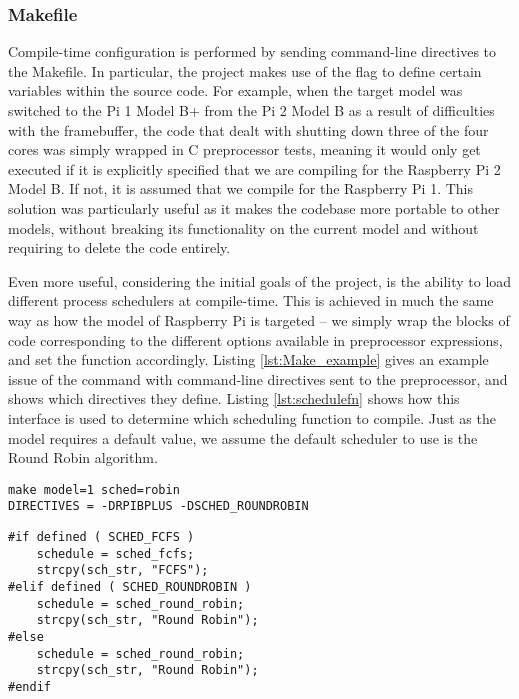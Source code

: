     \subsubsection{Makefile}
        \label{sec:directives}
        Compile-time configuration is performed by sending command-line
        directives to the Makefile. In particular, the project makes use of the
         flag to define certain variables within the source code. For
        example, when the target model was switched to the Pi 1 Model B+ from
        the Pi 2 Model B as a result of difficulties with the framebuffer, the
        code that dealt with shutting down three of the four cores was simply
        wrapped in C preprocessor  tests, meaning it would
        only get executed if it is explicitly specified that we are compiling
        for the Raspberry Pi 2 Model B. If not, it is assumed that we compile
        for the Raspberry Pi 1. This solution was particularly useful as it
        makes the codebase more portable to other models, without breaking its
        functionality on the current model and without requiring to delete the
        code entirely.

        Even more useful, considering the initial goals of the project, is the
        ability to load different process schedulers at compile-time. This is
        achieved in much the same way as how the model of Raspberry Pi is
        targeted -- we simply wrap the blocks of code corresponding to the
        different options available in preprocessor expressions, and set the
         function accordingly. Listing
        \ref{lst:Make_example} gives an example issue of the  command
        with command-line directives sent to the preprocessor, and shows which
        directives they define. Listing \ref{lst:schedulefn} shows how this
        interface is used to determine which scheduling function to compile.
        Just as the model requires a default value, we assume the default
        scheduler to use is the Round Robin algorithm.

        \begin{lstlisting}[caption={An example \code{make} command, and the
        directives it defines},captionpos=b,label={lst:Make_example}]
make model=1 sched=robin
DIRECTIVES = -DRPIBPLUS -DSCHED_ROUNDROBIN
        \end{lstlisting}

        \begin{lstlisting}[caption={Configuring the scheduling algorithm at
        compile-time},captionpos=b,label={lst:schedulefn}]
#if defined ( SCHED_FCFS )
    schedule = sched_fcfs;
    strcpy(sch_str, "FCFS");
#elif defined ( SCHED_ROUNDROBIN )
    schedule = sched_round_robin;
    strcpy(sch_str, "Round Robin");
#else
    schedule = sched_round_robin;
    strcpy(sch_str, "Round Robin");
#endif
        \end{lstlisting}

